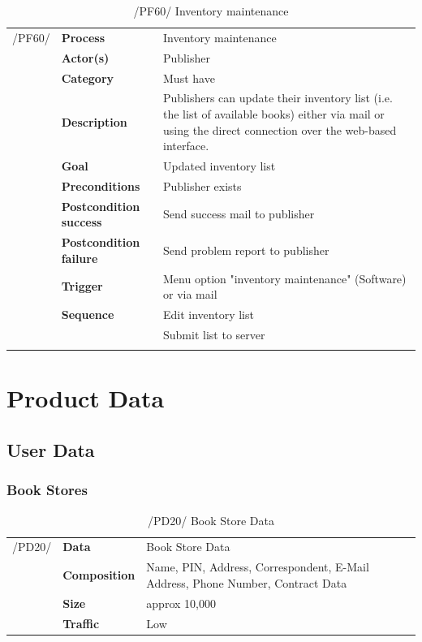 \documentclass[11pt,a4paper,oneside,svgnames]{report}
\begin{document}
\begin{table}[H]
\centering
\begin{tabular}{p{1.5cm}p{3cm}p{8cm}}
\cellcolor{white}/PF60/	& \textbf{Process} & Inventory maintenance\\
\cellcolor{white}		& \textbf{Actor(s)} & Publisher\\
\cellcolor{white}		& \textbf{Category} & Must have\\
\cellcolor{white}		& \textbf{Description}	 & Publishers can update their inventory list
(i.e. the list of available books) either via mail or using the direct connection over the web-based interface.\\
\cellcolor{white}		& \textbf{Goal} & Updated inventory list\\
\cellcolor{white}		& \textbf{Preconditions} & Publisher exists\\
\cellcolor{white}		& \textbf{Postcondition success} & Send success mail to publisher\\
\cellcolor{white}		& \textbf{Postcondition failure} & Send problem report to publisher\\
\cellcolor{white}		& \textbf{Trigger} & Menu option "inventory maintenance" (Software) or via mail\\
\cellcolor{white}		& \textbf{Sequence} & Edit inventory list\\
\cellcolor{white}		& & Submit list to server\\
\cellcolor{white}\hfill \\
\end{tabular}
\caption{/PF60/ Inventory maintenance}
\label{tab:pf60}
\end{table}


\chapter{Product Data}
\section{User Data}
\subsection{Book Stores}


\begin{table}[H]
\centering
\begin{tabular}{llp{8.75cm}}
\cellcolor{white}/PD20/	& \textbf{Data}			& Book Store Data\\
\cellcolor{white}		& \textbf{Composition}	& Name, PIN, Address, Correspondent, E-Mail Address, Phone Number, Contract Data\\
\cellcolor{white}		& \textbf{Size}		& approx 10,000\\
\cellcolor{white}		& \textbf{Traffic}		& Low\\
\end{tabular} 
\caption{/PD20/ Book Store Data}
\label{tab:pd20}
\end{table}
\end{document}
